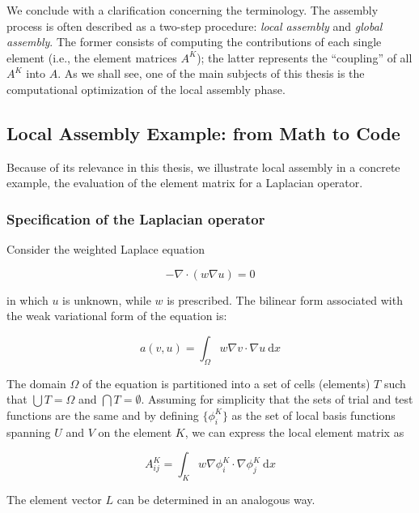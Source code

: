 We conclude with a clarification concerning the terminology. The assembly process is often described as a two-step procedure: {\em local assembly}  and {\em global assembly}. The former consists of computing the contributions of each single element (i.e., the element matrices $A^K$); the latter represents the ``coupling'' of all $A^K$ into $A$. As we shall see, one of the main subjects of this thesis is the computational optimization of the local assembly phase.

\subsection{Local Assembly Example: from Math to Code}
\label{sec:bkg:math-to-code}
Because of its relevance in this thesis, we illustrate local assembly in a concrete example, the evaluation of the element matrix for a Laplacian operator. 

\subsubsection{Specification of the Laplacian operator}
Consider the weighted Laplace equation

\begin{equation}
- \nabla \cdot (w \nabla u) = 0
\end{equation}

in which $u$ is unknown, while $w$ is prescribed. The bilinear form associated with the weak variational form of the equation is:

\begin{equation}
\label{sec:bkg:eq:spec-laplacian}
a(v, u) = \int_\Omega w \nabla v \cdot \nabla u\ \mathrm{d}x
\end{equation}

The domain $\Omega$ of the equation is partitioned into a set of cells (elements) $T$ such that $\bigcup T = \Omega$ and $\bigcap T = \emptyset$. Assuming for simplicity that the sets of trial and test functions are the same and by defining $\lbrace \phi_i^K \rbrace$ as the set of local basis functions spanning $U$ and $V$ on the element $K$, we can express the local element matrix as

\begin{equation}
\label{sec:bkg:stiffness}
A_{ij}^K = \int_K w \nabla \phi_i^K \cdot \nabla \phi_j^K\ \mathrm{d}x
\end{equation}

The element vector $L$ can be determined in an analogous way. 


